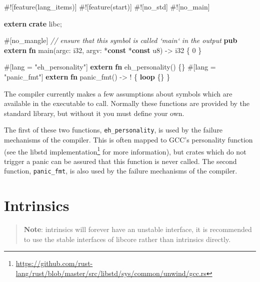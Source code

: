 \documentclass[a4paper,]{book}
\newenvironment{Shaded}{\begin{snugshade}}{\end{snugshade}}
\newcommand{\KeywordTok}[1]{\textcolor[rgb]{0.13,0.29,0.53}{\textbf{{#1}}}}
\newcommand{\DataTypeTok}[1]{\textcolor[rgb]{0.13,0.29,0.53}{{#1}}}
\newcommand{\DecValTok}[1]{\textcolor[rgb]{0.00,0.00,0.81}{{#1}}}
\newcommand{\StringTok}[1]{\textcolor[rgb]{0.31,0.60,0.02}{{#1}}}
\newcommand{\CommentTok}[1]{\textcolor[rgb]{0.56,0.35,0.01}{\textit{{#1}}}}
\newcommand{\AttributeTok}[1]{\textcolor[rgb]{0.77,0.63,0.00}{{#1}}}
\newcommand{\NormalTok}[1]{{#1}}
\renewcommand{\href}[2]{#2\footnote{\url{#1}}}
\begin{document}
\begin{Shaded}
\begin{Highlighting}[]
\AttributeTok{#![}\NormalTok{feature}\AttributeTok{(}\NormalTok{lang_items}\AttributeTok{)]}
\AttributeTok{#![}\NormalTok{feature}\AttributeTok{(}\NormalTok{start}\AttributeTok{)]}
\AttributeTok{#![}\NormalTok{no_std}\AttributeTok{]}
\AttributeTok{#![}\NormalTok{no_main}\AttributeTok{]}

\KeywordTok{extern} \KeywordTok{crate} \NormalTok{libc;}

\AttributeTok{#[}\NormalTok{no_mangle}\AttributeTok{]} \CommentTok{// ensure that this symbol is called `main` in the output}
\KeywordTok{pub} \KeywordTok{extern} \KeywordTok{fn} \NormalTok{main(argc: }\DataTypeTok{i32}\NormalTok{, argv: *}\KeywordTok{const} \NormalTok{*}\KeywordTok{const} \DataTypeTok{u8}\NormalTok{) -> }\DataTypeTok{i32} \NormalTok{\{}
    \DecValTok{0}
\NormalTok{\}}

\AttributeTok{#[}\NormalTok{lang }\AttributeTok{=} \StringTok{"eh_personality"}\AttributeTok{]} \KeywordTok{extern} \KeywordTok{fn} \NormalTok{eh_personality() \{\}}
\AttributeTok{#[}\NormalTok{lang }\AttributeTok{=} \StringTok{"panic_fmt"}\AttributeTok{]} \KeywordTok{extern} \KeywordTok{fn} \NormalTok{panic_fmt() -> ! \{ }\KeywordTok{loop} \NormalTok{\{\} \}}
\end{Highlighting}
\end{Shaded}

The compiler currently makes a few assumptions about symbols which are
available in the executable to call. Normally these functions are
provided by the standard library, but without it you must define your
own.

The first of these two functions, \texttt{eh\_personality}, is used by
the failure mechanisms of the compiler. This is often mapped to GCC's
personality function (see the
\href{https://github.com/rust-lang/rust/blob/master/src/libstd/sys/common/unwind/gcc.rs}{libstd
implementation} for more information), but crates which do not trigger a
panic can be assured that this function is never called. The second
function, \texttt{panic\_fmt}, is also used by the failure mechanisms of
the compiler.

\hypertarget{sec--intrinsics}{\section{Intrinsics}\label{sec--intrinsics}}

\begin{quote}
\textbf{Note}: intrinsics will forever have an unstable interface, it is
recommended to use the stable interfaces of libcore rather than
intrinsics directly.
\end{quote}
\end{document}
